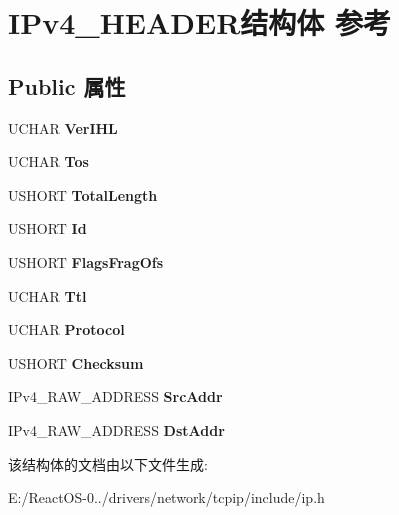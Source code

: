 \hypertarget{struct_i_pv4___h_e_a_d_e_r}{}\section{I\+Pv4\+\_\+\+H\+E\+A\+D\+E\+R结构体 参考}
\label{struct_i_pv4___h_e_a_d_e_r}
\subsection*{Public 属性}
\begin{DoxyCompactItemize}
\item 
\mbox{\label{struct_i_pv4___h_e_a_d_e_r_aec58f212bb98662680dd7ebcccc60482}} 
U\+C\+H\+AR {\bfseries Ver\+I\+HL}
\item 
\mbox{\label{struct_i_pv4___h_e_a_d_e_r_a054637315ef944b0e45e1bb9483ebb71}} 
U\+C\+H\+AR {\bfseries Tos}
\item 
\mbox{\label{struct_i_pv4___h_e_a_d_e_r_a70d3d4deb19318af026d784ae373816f}} 
U\+S\+H\+O\+RT {\bfseries Total\+Length}
\item 
\mbox{\label{struct_i_pv4___h_e_a_d_e_r_a6fc346addf11f672d0033ad9b9aec47f}} 
U\+S\+H\+O\+RT {\bfseries Id}
\item 
\mbox{\label{struct_i_pv4___h_e_a_d_e_r_af7c8e9b2b4d27be5d181c4c1d37c53f9}} 
U\+S\+H\+O\+RT {\bfseries Flags\+Frag\+Ofs}
\item 
\mbox{\label{struct_i_pv4___h_e_a_d_e_r_a6547680f0cbb24353694a3d229e26e4a}} 
U\+C\+H\+AR {\bfseries Ttl}
\item 
\mbox{\label{struct_i_pv4___h_e_a_d_e_r_ad2235b42d4c97a191a420fc51fb72d02}} 
U\+C\+H\+AR {\bfseries Protocol}
\item 
\mbox{\label{struct_i_pv4___h_e_a_d_e_r_ae79da9bb5cfcadce3b3a3e971cdfa3eb}} 
U\+S\+H\+O\+RT {\bfseries Checksum}
\item 
\mbox{\label{struct_i_pv4___h_e_a_d_e_r_a5bab1246e9c5f6498744fbb2892141a6}} 
I\+Pv4\+\_\+\+R\+A\+W\+\_\+\+A\+D\+D\+R\+E\+SS {\bfseries Src\+Addr}
\item 
\mbox{\label{struct_i_pv4___h_e_a_d_e_r_ac404004136fdc16353db04acad2ab103}} 
I\+Pv4\+\_\+\+R\+A\+W\+\_\+\+A\+D\+D\+R\+E\+SS {\bfseries Dst\+Addr}
\end{DoxyCompactItemize}


该结构体的文档由以下文件生成\+:\begin{DoxyCompactItemize}
\item 
E\+:/\+React\+O\+S-\/0../drivers/network/tcpip/include/ip.\+h\end{DoxyCompactItemize}
